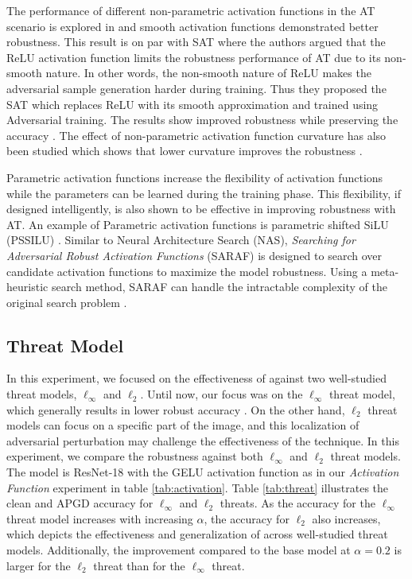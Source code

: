 \documentclass[conference]{IEEEtran}
\begin{document}
The performance of different non-parametric activation functions in the AT scenario is explored in \cite{utlgq20} and smooth activation functions demonstrated better robustness. This result is on par with SAT where the authors argued that the ReLU activation function limits the robustness performance of AT due to its non-smooth nature. In other words, the non-smooth nature of ReLU makes the adversarial sample generation harder during training.  Thus they proposed the SAT which replaces ReLU with its smooth approximation and trained using Adversarial training. The results show improved robustness while preserving the accuracy \cite{satxt20}. The effect of non-parametric activation function curvature has also been studied which shows that lower curvature improves the robustness \cite{lcass21}.
 
 Parametric activation functions increase the flexibility of activation functions while the parameters can be learned during the training phase. This flexibility, if designed intelligently, is also shown to be effective in improving robustness with AT. An example of Parametric activation functions is parametric shifted SiLU (PSSILU) \cite{pafdm22}. Similar to Neural Architecture Search (NAS), \emph{Searching for Adversarial Robust Activation Functions} (SARAF) is designed to search over candidate activation functions to maximize the model robustness. Using a meta-heuristic search method, SARAF can handle the intractable complexity of the original search problem \cite{ssfsl23, lafsl23}.

\subsection{Threat Model}\label{abl:threat_model}
In this experiment, we focused on the effectiveness of \sys against two well-studied threat models, $\ell_\infty$ and $\ell_2$. Until now, our focus was on the $\ell_\infty$ threat model, which generally results in lower robust accuracy \cite{rasca20}. On the other hand, $\ell_2$ threat models can focus on a specific part of the image, and this localization of adversarial perturbation may challenge the effectiveness of the \sys technique. In this experiment, we compare the robustness against both $\ell_\infty$ and $\ell_2$ threat models. The model is ResNet-18 with the GELU activation function as in our \emph{Activation Function} experiment in table \ref{tab:activation}. Table \ref{tab:threat} illustrates the clean and APGD accuracy for $\ell_\infty$ and $\ell_2$ threats. As the accuracy for the $\ell_\infty$ threat model increases with increasing $\alpha$, the accuracy for $\ell_2$ also increases, which depicts the effectiveness and generalization of \sys across well-studied threat models. Additionally, the improvement compared to the base model at $\alpha=0.2$ is larger for the $\ell_2$ threat than for the $\ell_\infty$ threat.
\end{document}
